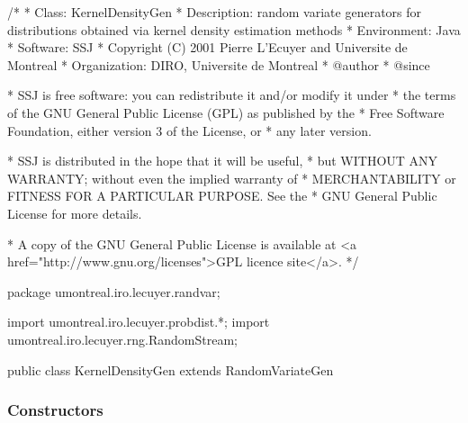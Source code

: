 \begin{code}
\begin{hide}
/*
 * Class:        KernelDensityGen
 * Description:  random variate generators for distributions obtained via
                 kernel density estimation methods
 * Environment:  Java
 * Software:     SSJ 
 * Copyright (C) 2001  Pierre L'Ecuyer and Universite de Montreal
 * Organization: DIRO, Universite de Montreal
 * @author       
 * @since

 * SSJ is free software: you can redistribute it and/or modify it under
 * the terms of the GNU General Public License (GPL) as published by the
 * Free Software Foundation, either version 3 of the License, or
 * any later version.

 * SSJ is distributed in the hope that it will be useful,
 * but WITHOUT ANY WARRANTY; without even the implied warranty of
 * MERCHANTABILITY or FITNESS FOR A PARTICULAR PURPOSE.  See the
 * GNU General Public License for more details.

 * A copy of the GNU General Public License is available at
   <a href="http://www.gnu.org/licenses">GPL licence site</a>.
 */
\end{hide}
package umontreal.iro.lecuyer.randvar;\begin{hide}
import umontreal.iro.lecuyer.probdist.*;
import umontreal.iro.lecuyer.rng.RandomStream;\end{hide}

public class KernelDensityGen extends RandomVariateGen\begin{hide} {

   protected RandomVariateGen kernelGen;
   protected double bandwidth;
   protected boolean positive;   // If we want positive reflection.
\end{hide}
\end{code}
\subsubsection* {Constructors}

